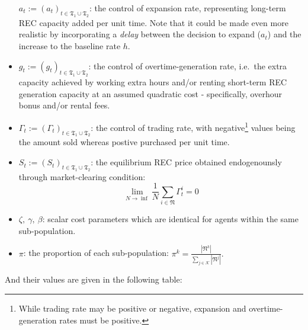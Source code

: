 \documentclass[
]{article}
\begin{document}
\begin{itemize}
  \(a_t := (a_t)_{t\in\mathfrak{T_1} \cup \mathfrak{T_2}}\): the control
  of expansion rate, representing long-term REC capacity added per unit
  time. Note that it could be made even more realistic by incorporating
  a \emph{delay} between the decision to expand (\(a_t\)) and the
  increase to the baseline rate \(h\).
\item
  \(g_t := (g_t)_{t\in\mathfrak{T_1} \cup \mathfrak{T_2}}\): the control
  of overtime-generation rate, i.e.~the extra capacity achieved by
  working extra hours and/or renting short-term REC generation capacity
  at an assumed quadratic cost - specifically, overhour bonus and/or
  rental fees.
\item
  \(\Gamma_t := (\Gamma_t)_{t\in\mathfrak{T_1} \cup \mathfrak{T_2}}\):
  the control of trading rate, with negative\footnote{While trading rate
    may be positive or negative, expansion and overtime-generation rates
    must be positive.} values being the amount sold whereas postive
  purchased per unit time.
\item
  \(S_t := (S_t)_{t\in\mathfrak{T_1} \cup \mathfrak{T_2}}\): the
  equilibrium REC price obtained endogenounsly through market-clearing
  condition:
  \[\lim\limits_{N \to \inf}{\frac{1}{N} \sum\limits_{i\in\mathfrak{N}}{\Gamma^i_t}}=0\]
\item
  \(\zeta,~\gamma,~\beta\): scalar cost parameters which are identical
  for agents within the same sub-population.
\item
  \(\pi\): the proportion of each sub-population:
  \(\pi^k=\frac{|\mathfrak{N}^k|}{\sum\limits_{j \in \mathcal{K}}{|\mathfrak{N}^j|}}.\)
\end{itemize}

And their values are given in the following table:
\end{document}
